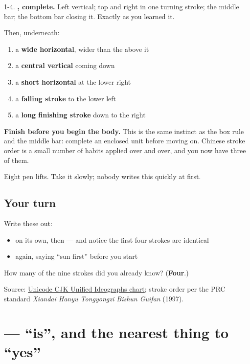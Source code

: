 1-4. \textbf{, complete.} Left vertical; top and right in one turning stroke; the middle bar; the bottom bar closing it. Exactly as you learned it.

Then, underneath:

\begin{enumerate}
\raggedright
  \item a \textbf{wide horizontal}, wider than the  above it
  \item a \textbf{central vertical} coming down
  \item a \textbf{short horizontal} at the lower right
  \item a \textbf{falling stroke} to the lower left
  \item a \textbf{long finishing stroke} down to the right
\end{enumerate}

\textbf{Finish  before you begin the body.} This is the same instinct as the box rule and the middle bar: complete an enclosed unit before moving on. Chinese stroke order is a small number of habits applied over and over, and you now have three of them.

Eight pen lifts. Take it slowly; nobody writes this quickly at first.

\subsection*{Your turn}
Write these out:

\begin{itemize}
\raggedright
  \item {} on its own, then  — and notice the first four strokes are identical
  \item {} again, saying \textquotedblleft{}sun first\textquotedblright{} before you start
\end{itemize}

\begin{tcolorbox}[breakable,colback=teal!4,colframe=teal!35!black,title={Before you move on}]
How many of the nine strokes did you already know? (\textbf{Four}.)

Source: \href{https://www.unicode.org/charts/PDF/U4E00.pdf}{Unicode CJK Unified Ideographs chart}; stroke order per the PRC standard \emph{Xiandai Hanyu Tongyongzi Bishun Guifan} (1997).
\end{tcolorbox}
\section[\texorpdfstring{\zh{是} (shì)}{是 (shì)}]{ — \textquotedblleft{}is\textquotedblright{}, and the nearest thing to \textquotedblleft{}yes\textquotedblright{}}

